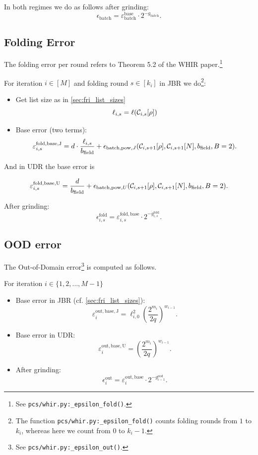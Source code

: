 In both regimes we do as follows after grinding:
\[
  \epsilon_{\mathrm{batch}}
  = \varepsilon_{\mathrm{batch}}^{\text{base}}
    \cdot 2^{-g_{\mathrm{batch}}}.
\]
\subsection{Folding Error}

The folding error per round refers to Theorem 5.2 of the WHIR paper.\footnote{See \texttt{pcs/whir.py:\_epsilon\_fold()}.}

For iteration \(i\in[M]\) and folding round \(s\in[k_i]\) in JBR we do\footnote{The function \texttt{pcs/whir.py:\_epsilon\_fold()}
counts folding rounds from \(1\) to \(k_i\), whereas here we count from \(0\) to \(k_i-1\).    }:
\begin{itemize}
    \item %
    Get list size as in \cref{sec:fri_list_sizes}
    $$
    \ell_{i,s} =\ell(\mathcal{C}_{i,s}[\rho])
    $$
    \item
Base error (two terms):
\[
  \varepsilon^{\mathrm{fold,base,J}}_{i,s}
    = d \cdot \frac{\ell_{i,s}}{b_{\mathrm{field}}}
      + \epsilon_{\mathrm{batch,pow},J} (\mathcal{C}_{i,s+1}[\rho],\mathcal{C}_{i,s+1}[N],b_{\mathrm{field}},B=2).
\]
\end{itemize} And in UDR the base error is

\[
  \varepsilon^{\mathrm{fold,base,U}}_{i,s}
    =  \frac{d}{b_{\mathrm{field}}}
      + \epsilon_{\mathrm{batch,pow},U} (\mathcal{C}_{i,s+1}[\rho],\mathcal{C}_{i,s+1}[N],b_{\mathrm{field}},B=2).
\]

After grinding:
\[
  \epsilon^{\mathrm{fold}}_{i,s}
    = \varepsilon^{\mathrm{fold,base}}_{i,s}
      \cdot 2^{-g^{\mathrm{fold}}_{i,s}}.
\]

\subsection{OOD error }

The Out-of-Domain error\footnote{See \texttt{pcs/whir.py:\_epsilon\_out()}.} is computed as follows.

For iteration \(i\in\{1,2,\ldots,M-1\}\)
\begin{itemize}
    \item
Base error in JBR (cf. \cref{sec:fri_list_sizes}):
\[
  \varepsilon^{\mathrm{out,base,J}}_i
  = \ell_{i,0}^2
    \left(\frac{2^{m_i}}{2q}\right)^{w_{i-1}}.
\]
\item Base error in UDR:
\[
  \varepsilon^{\mathrm{out,base,U}}_i
  =  \left(\frac{2^{m_i}}{2q}\right)^{w_{i-1}}.
\]
\item After grinding:
\[
  \epsilon^{\mathrm{out}}_i
  = \varepsilon^{\mathrm{out,base}}_i
    \cdot 2^{-g^{\mathrm{ood}}_{i-1}}.
\]

\end{itemize}
